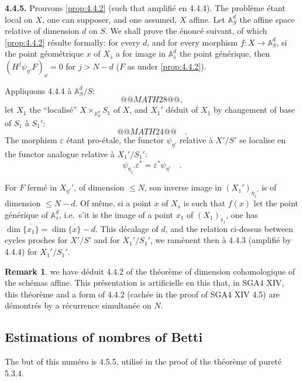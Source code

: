 \documentclass[12pt,a4paper]{article}
\theoremstyle{plain}
\theoremstyle{definition}
\newtheorem{remark}[theorem]{Remark}
\providecommand{\comma}{,}
\begin{document}
{{\noindent\textbf{4.4.5.} Prouvons \ref{prop:4.4.2} (such that amplifi\'{e} en 4.4.4). The probl\`{e}me \'{e}tant local on $X$, one can supposer, and one assumed, $X$ affine. Let $\mathbb{A}_{S}^{d}$ the affine space relative of dimension $d$ on $S$. We shall prove the \'{e}nonc\'{e} suivant, of which \ref{prop:4.4.2} r\'{e}sulte formally: for every $d$, and for every morphism $f: X \to \mathbb{A}_{S}^{d}$, si the point g\'{e}om\'{e}trique $x$ of $X_{\overline{s}}$ a for image in $\mathbb{A}_{\overline{s}}^{d}$ the point g\'{e}n\'{e}rique, then $(H^{j}\psi_{\eta'}F)_{x} = 0$ for $j > N-d$ ($F$ as under \ref{prop:4.4.2}).

Appliquons 4.4.4 \`{a} $\mathbb{A}_{S}^{d}/S$:
\[
@@MATH28@@
\comma
\]
let $X_{1}$ the ``localis\'{e}'' $X \times_{\mathbb{A}_{S}^{d}} S_{1}$ of $X$, and $X_{1}'$ d\'{e}duit of $X_{1}$ by changement of base of $S_{1}$ \`{a} $S_{1}'$:
\[
@@MATH24@@
\quad.
\]
The morphism $\varepsilon$ \'{e}tant pro-\'{e}tale, the functor $\psi_{\eta'}$ relative \`{a} $X'/S'$ se localise en the functor analogue relative \`{a} $X_{1}'/S_{1}'$:
\[
\psi_{\eta_{1}'} \varepsilon^{*} = \varepsilon^{*} \psi_{\eta'}\quad.
\]


For $F$ ferm\'{e} in $X_{\eta'}'$, of dimension $\leq N$, son inverse image in $(X_{1}')_{\eta_{1}'}$ is of dimension $\leq N-d$. Of m\^{e}me, si a point $x$ of $X_{\overline{s}}$ is such that $f(x)$ let the point g\'{e}n\'{e}rique of $\mathbb{A}_{\overline{s}}^{d}$, i.e.\ s'it is the image of a point $x_{1}$ of $(X_{1})_{\overline{s}_{1}}$, one has $\dim\overline{\{x_{1}\}} = \dim\overline{\{x\}} - d$. This d\'{e}calage of $d$, and the relation ci-dessus between cycles proches for $X'/S'$ and for $X_{1}'/S_{1}'$, we ram\`{e}nent then \`{a} 4.4.3 (amplifi\'{e} by 4.4.4) for $X_{1}'/S_{1}'$.

\begin{remark}\label{rem:4.4.5}
we have d\'{e}duit 4.4.2 of the th\'{e}or\`{e}me of dimension cohomologique of the sch\'{e}mas affine. This pr\'{e}sentation is artificielle en this that, in SGA4 XIV, this th\'{e}or\`{e}me and a form of 4.4.2 (cach\'{e}e in the proof of SGA4 XIV 4.5) are d\'{e}montr\'{e}s by a r\'{e}currence simultan\'{e}e on $N$.
\end{remark}

\subsection{Estimations of nombres of Betti}

The but of this num\'{e}ro is 4.5.5, utilis\'{e} in the proof of the th\'{e}or\`{e}me of puret\'{e} 5.3.4.

}}
\end{document}
